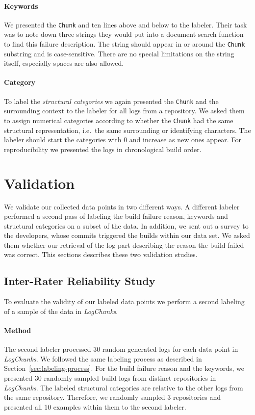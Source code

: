 \documentclass[\myrootdir/main.tex]{subfiles}
\begin{document}
\paragraph{Keywords}
We presented the \texttt{Chunk} and ten lines above and below to the labeler.
Their task was to note down three strings they would put into a document search function to find this failure description.
The string should appear in or around the \texttt{Chunk} substring and is case-sensitive.
There are no special limitations on the string itself, especially spaces are also allowed.

\paragraph{Category}
To label the \emph{structural categories} we again presented the \texttt{Chunk} and the surrounding context to the labeler for all logs from a repository.
We asked them to assign numerical categories according to whether the \texttt{Chunk} had the same structural representation, i.e.\ the same surrounding or identifying characters.
The labeler should start the categories with 0 and increase as new ones appear.
For reproducibility we presented the logs in chronological build order.

\section{Validation}
We validate our collected data points in two different ways.
A different labeler performed a second pass of labeling the build failure reason, keywords and structural categories on a subset of the data.
In addition, we sent out a survey to the developers, whose commits triggered the builds within our data set.
We asked them whether our retrieval of the log part describing the reason the build failed was correct.
This sections describes these two validation studies.

\subsection{Inter-Rater Reliability Study}
To evaluate the validity of our labeled data points we perform a second labeling of a sample of the data in \emph{LogChunks}.

\paragraph{Method}
The second labeler processed 30 random generated logs for each data point in \emph{LogChunks}.
We followed the same labeling process as described in Section~\ref{sec:labeling-process}.
For the build failure reason and the keywords, we presented 30 randomly sampled build logs from distinct repositories in \emph{LogChunks}.
The labeled structural categories are relative to the other logs from the same repository.
Therefore, we randomly sampled 3 repositories and presented all 10 examples within them to the second labeler.
\end{document}
